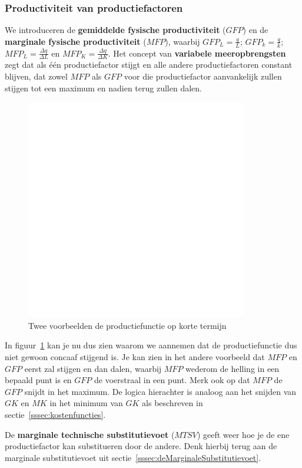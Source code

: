\subsubsection{Productiviteit van productiefactoren}
We introduceren de \textbf{gemiddelde fysische productiviteit} ($GFP$) en de \textbf{marginale fysische productiviteit} ($MFP$), waarbij $GFP_L = \frac{q}{L}$; $GFP_k = \frac{q}{k}$; $MFP_L = \frac{\Delta q}{\Delta L}$ en  $MFP_K = \frac{\Delta q}{\Delta K}$. Het concept van \textbf{variabele meeropbrengsten} zegt dat als \'e\'en productiefactor stijgt en alle andere productiefactoren constant blijven, dat zowel $MFP$ als $GFP$ voor die productiefactor aanvankelijk zullen stijgen tot een maximum en nadien terug zullen dalen.
\begin{figure}[htbp]
	\centering
	\includegraphics[scale=0.4]{Images/white.png}
	\caption{Twee voorbeelden de productiefunctie op korte termijn}
	\label{fig:productiefunctieKorteTermijn}
\end{figure}

In figuur~\ref{fig:productiefunctieKorteTermijn} kan je nu dus zien waarom we aannemen dat de productiefunctie dus niet gewoon concaaf stijgend is. Je kan zien in het andere voorbeeld dat $MFP$ en $GFP$ eerst zal stijgen en dan dalen, waarbij $MFP$ wederom de helling in een bepaald punt is en $GFP$ de voerstraal in een punt. Merk ook op dat $MFP$ de $GFP$ snijdt in het maximum. De logica hierachter is analoog aan het snijden van $GK$ en $MK$ in het minimum van $GK$ als beschreven in sectie~\ref{sssec:kostenfuncties}.

De \textbf{marginale technische substitutievoet} ($MTSV$) geeft weer hoe je de ene productiefactor kan substitueren door de andere. Denk hierbij terug aan de marginale substitutievoet uit sectie~\ref{sssec:deMarginaleSubstitutievoet}.

